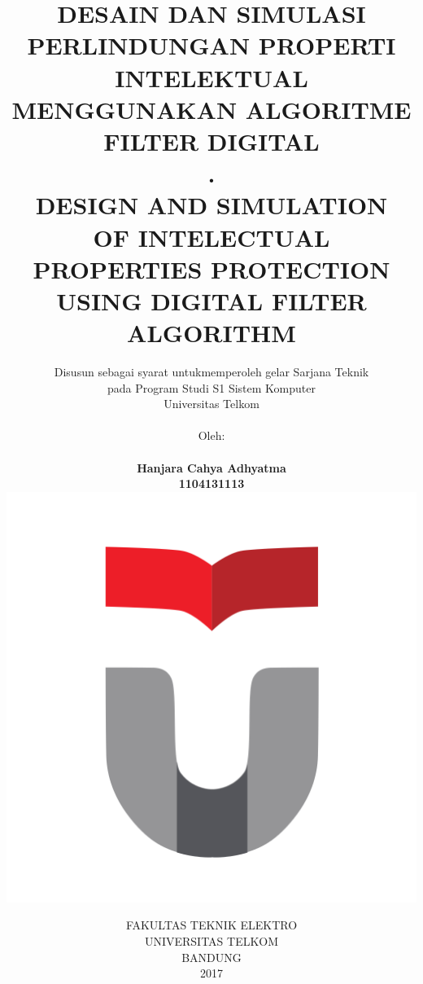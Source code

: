 \documentclass[a4paper,12pt,oneside]{book}
\newcommand\blankpage{%
	\null
	\thispagestyle{empty}%
	\addtocounter{page}{-1}%
	\newpage}
\begin{document}
\title{\tfont DESAIN DAN SIMULASI\\
	PERLINDUNGAN PROPERTI INTELEKTUAL\\
	MENGGUNAKAN ALGORITME FILTER DIGITAL\\.\\	
	DESIGN AND SIMULATION\\
	OF INTELECTUAL PROPERTIES PROTECTION\\
	USING DIGITAL FILTER ALGORITHM
}
\author{
	Disusun sebagai syarat untukmemperoleh gelar Sarjana Teknik\\
	pada Program Studi S1 Sistem Komputer\\
	Universitas Telkom\\\\
	Oleh:\\\\
	\textbf{Hanjara Cahya Adhyatma}\\
	\textbf{1104131113}\\
	\includegraphics[scale=0.13]{logo}
}

\date{
	FAKULTAS TEKNIK ELEKTRO\\
	UNIVERSITAS TELKOM\\
	BANDUNG\\
	2017}
\maketitle
\tableofcontents
\listoffigures
\listoftables
\addtocounter{page}{-3}
\afterpage{\blankpage}

\afterpage{\blankpage}

\afterpage{\blankpage}

\afterpage{\blankpage}

\afterpage{\blankpage}

\afterpage{\blankpage}
\end{document}
